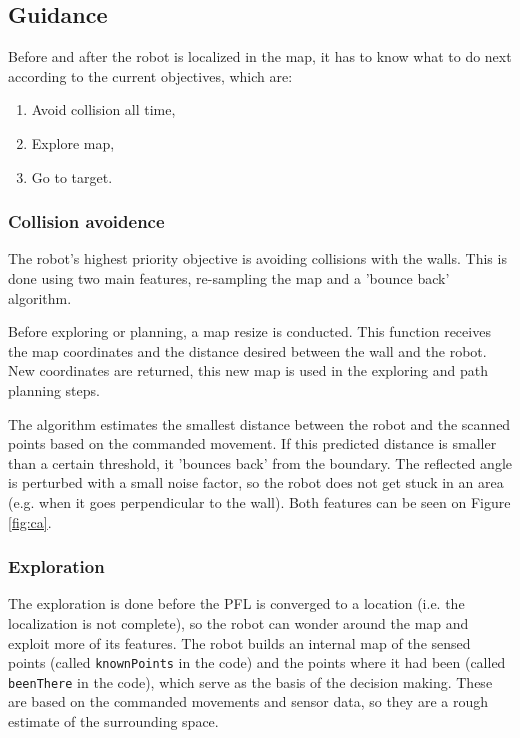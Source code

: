 \subsection{Guidance}

	Before and after the robot is localized in the map, it has to know what to do next according to the current objectives, which are:
	\begin{enumerate}
		\item Avoid collision all time,
		\item Explore map,
		\item Go to target.
	\end{enumerate}
	
	\subsubsection{Collision avoidence}
	
		The robot's highest priority objective is avoiding collisions with the walls. This is done using two main features, re-sampling the map and a 'bounce back' algorithm.
		
		Before exploring or planning, a map resize is conducted. This function receives the map coordinates and the distance desired between the wall and the robot. New coordinates are returned, this new map is used in the exploring and path planning steps.
		 
		The algorithm estimates the smallest distance between the robot and the scanned points based on the commanded movement. If this predicted distance is smaller than a certain threshold, it 'bounces back' from the boundary. The reflected angle is perturbed with a small noise factor, so the robot does not get stuck in an area (e.g. when it goes perpendicular to the wall). Both features can be seen on Figure \ref{fig:ca}.
		
%		    
	
	\subsubsection{Exploration}
	
		The exploration is done before the PFL is converged to a location (i.e. the localization is not complete), so the robot can wonder around the map and exploit more of its features. The robot builds an internal map of the sensed points (called {\tt knownPoints} in the code) and the points where it had been (called {\tt beenThere} in the code), which serve as the basis of the decision making. These are based on the commanded movements and sensor data, so they are a rough estimate of the surrounding space. 
		
